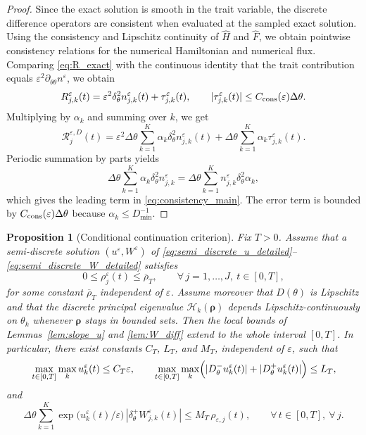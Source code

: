 \documentclass[11pt, dina4, amsfont12]{article}
\newtheorem{proposition}{Proposition}[section]
\begin{document}
\begin{proof}
Since the exact solution is smooth in the trait variable, the discrete difference operators are consistent when evaluated at the sampled exact solution. Using the consistency and Lipschitz continuity of \(\widehat H\) and \(\widehat F\), we obtain pointwise consistency relations for the numerical Hamiltonian and numerical flux. Comparing \eqref{eq:R_exact} with the continuous identity that the trait contribution equals \(\varepsilon^2\partial_{\theta\theta}n^\varepsilon\), we obtain
\[
R_{j,k}^\varepsilon(t)
=
\varepsilon^2\delta_\theta^2 n_{j,k}^\varepsilon(t)
+\tau_{j,k}^\varepsilon(t),
\qquad
|\tau_{j,k}^\varepsilon(t)|\le C_{\rm cons}(\varepsilon)\Delta\theta.
\]
Multiplying by \(\alpha_k\) and summing over \(k\), we get
\[
\mathcal R_j^{\varepsilon,D}(t)
=
\varepsilon^2\Delta\theta\sum_{k=1}^K \alpha_k\delta_\theta^2 n_{j,k}^\varepsilon(t)
+\Delta\theta\sum_{k=1}^K \alpha_k\tau_{j,k}^\varepsilon(t).
\]
Periodic summation by parts yields
\[
\Delta\theta\sum_{k=1}^K \alpha_k\delta_\theta^2 n_{j,k}^\varepsilon
=
\Delta\theta\sum_{k=1}^K n_{j,k}^\varepsilon\delta_\theta^2\alpha_k,
\]
which gives the leading term in \eqref{eq:consistency_main}. The error term is bounded by \(C_{\rm cons}(\varepsilon)\Delta\theta\) because \(\alpha_k\le D_{\min}^{-1}\).
\end{proof}

\begin{proposition}[Conditional continuation criterion]\label{prop:conditional_cont}
Fix \(T>0\). Assume that a semi-discrete solution \((u^\varepsilon,W^\varepsilon)\) of \eqref{eq:semi_discrete_u_detailed}--\eqref{eq:semi_discrete_W_detailed} satisfies
\[
0\le \rho_j^\varepsilon(t)\le \overline\rho_T,
\qquad
\forall\,j=1,\dots,J,\ t\in[0,T],
\]
for some constant \(\overline\rho_T\) independent of \(\varepsilon\). Assume moreover that \(D(\theta)\) is Lipschitz and that the discrete principal eigenvalue \(\mathcal H_k(\boldsymbol\rho)\) depends Lipschitz-continuously on \(\theta_k\) whenever \(\boldsymbol\rho\) stays in bounded sets. Then the local bounds of Lemmas~\ref{lem:slope_u} and \ref{lem:W_diff} extend to the whole interval \([0,T]\). In particular, there exist constants \(C_T\), \(L_T\), and \(M_T\), independent of \(\varepsilon\), such that
\[
\max_{t\in[0,T]}\max_k u_k^\varepsilon(t)\le C_T\varepsilon,
\qquad
\max_{t\in[0,T]}\max_k\Bigl(|D_\theta^-u_k^\varepsilon(t)|+|D_\theta^+u_k^\varepsilon(t)|\Bigr)\le L_T,
\]
and
\[
\Delta\theta\sum_{k=1}^K
\exp\!\bigl(u_k^\varepsilon(t)/\varepsilon\bigr)\,|\delta_\theta^+ W_{j,k}^\varepsilon(t)|
\le M_T\,\rho_{\varepsilon,j}(t),
\qquad \forall\,t\in[0,T],\ \forall\,j.
\]
\end{proposition}
\end{document}

